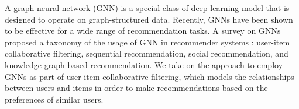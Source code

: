 \documentclass{article}
\begin{document}


A graph neural network (GNN) is a special class of deep learning model that is designed to operate on graph-structured data. Recently, GNNs have been shown to be effective for a wide range of recommendation tasks. A survey on GNNs proposed a taxonomy of the usage of GNN in recommender systems \cite{survey}: user-item collaborative filtering, sequential recommendation, social recommendation, and knowledge graph-based recommendation. We take on the approach to employ GNNs as part of user-item collaborative filtering, which models the relationships between users and items in order to make recommendations based on the preferences of similar users.

\end{document}
